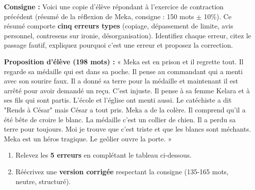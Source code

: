 \documentclass[11pt]{article}
\begin{document}
\begin{exercice}
\textbf{Consigne :} Voici une copie d'élève répondant à l'exercice de contraction précédent (résumé de la réflexion de Meka, consigne : 150 mots $\pm$ 10\%). Ce résumé comporte \textbf{cinq erreurs types} (copiage, dépassement de limite, avis personnel, contresens sur ironie, désorganisation). Identifiez chaque erreur, citez le passage fautif, expliquez pourquoi c'est une erreur et proposez la correction.

\textbf{Proposition d'élève (198 mots) :}
« Meka est en prison et il regrette tout. Il regarde sa médaille qui est dans sa poche. Il pense au commandant qui a menti avec son sourire faux. Il a donné sa terre pour la médaille et maintenant il est arrêté pour avoir demandé un reçu. C'est injuste. Il pense à sa femme Kelara et à ses fils qui sont partis. L'école et l'église ont menti aussi. Le catéchiste a dit "Rends à César" mais César a tout pris. Meka a de la colère. Il comprend qu'il a été bête de croire le blanc. La médaille c'est un collier de chien. Il a perdu sa terre pour toujours. Moi je trouve que c'est triste et que les blancs sont méchants. Meka est un héros tragique. Le geôlier ouvre la porte. »

\begin{enumerate}
    \item Relevez les \textbf{5 erreurs} en complétant le tableau ci-dessous.
    \item Réécrivez une \textbf{version corrigée} respectant la consigne (135-165 mots, neutre, structuré).
\end{enumerate}


\end{exercice}
\end{document}
